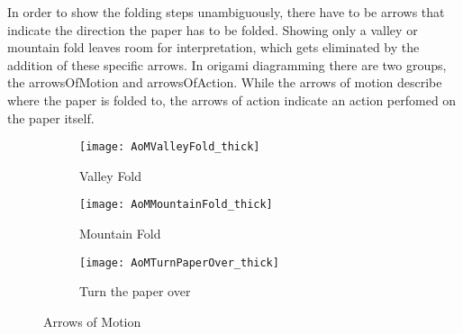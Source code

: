 In order to show the folding steps unambiguously, there have to be arrows that indicate the direction the paper has to be folded. Showing only a valley or mountain fold leaves room for interpretation, which gets eliminated by the addition of these specific arrows. In origami diagramming there are two groups, the \gls{arrowsOfMotion} and \gls{arrowsOfAction}.
While the arrows of motion describe where the paper is folded to, the arrows of action indicate an action perfomed on the paper itself.
\begin{figure*}[htbp]
    \centering
    \begin{subfigure}{0.3\textwidth}
        \texttt{[image: AoMValleyFold\_thick]}
        \caption{Valley Fold}
        \label{fig:aomValleyFold}
    \end{subfigure}
    \begin{subfigure}{0.3\textwidth}
        \texttt{[image: AoMMountainFold\_thick]}
        \caption{Mountain Fold}
        \label{fig:aomMountainFold}
    \end{subfigure}
    \begin{subfigure}{0.3\textwidth}
        \texttt{[image: AoMTurnPaperOver\_thick]}
        \caption{Turn the paper over}
        \label{fig:aomTurnPaperOver}
    \end{subfigure}
    \caption{Arrows of Motion}
    \label{fig:arrowsOfMotion}
\end{figure*}

